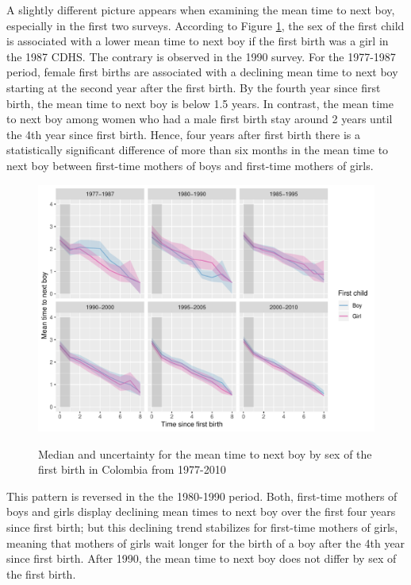 \documentclass{article}
\begin{document}
A slightly different picture appears when examining the mean time to next boy, especially in the first two surveys. According to Figure \ref{fert_02}, the sex of the first child is associated with a lower mean time to next boy if the first birth was a girl in the 1987 CDHS. The contrary is observed in the 1990 survey. For the 1977-1987 period, female first births are associated with a declining mean time to next boy starting at the second year after the first birth. By the fourth year since first birth, the mean time to next boy is below 1.5 years. In contrast, the mean time to next boy among women who had a male first birth stay around 2 years until the 4th year since first birth. Hence, four years after first birth there is a statistically significant difference of more than six months in the mean time to next boy between first-time mothers of boys and first-time mothers of girls.

\begin{figure}[H]
\centering
    \includegraphics[scale=0.8]{Spells/Figures/colombia/colombia_period_boost_2.pdf}\\
    \caption{Median and uncertainty for the mean time to next boy by sex of the first birth in Colombia from 1977-2010}
    \label{fert_02}
\end{figure}

This pattern is reversed in the the 1980-1990 period. Both, first-time mothers of boys and girls display declining mean times to next boy over the first four years since first birth; but this declining trend stabilizes for first-time mothers of girls, meaning that mothers of girls wait longer for the birth of a boy after the 4th year since first birth. After 1990, the mean time to next boy does not differ by sex of the first birth.
\end{document}
